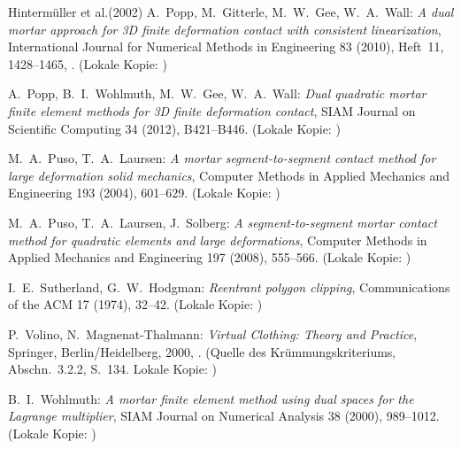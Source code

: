 \documentclass[a4paper,11pt]{article}
\begin{document}
\begin{thebibliography}{Hintermüller et al.(2002)}
 A.~Popp, M.~Gitterle, M.~W.~Gee, W.~A.~Wall: \emph{A dual mortar approach for 3D finite deformation contact with consistent linearization}, International Journal for Numerical Methods in Engineering 83 (2010), Heft~11, 1428--1465, . (Lokale Kopie: )

 A.~Popp, B.~I.~Wohlmuth, M.~W.~Gee, W.~A.~Wall: \emph{Dual quadratic mortar finite element methods for 3D finite deformation contact}, SIAM Journal on Scientific Computing 34 (2012), B421--B446. (Lokale Kopie: )

 M.~A.~Puso, T.~A.~Laursen: \emph{A mortar segment-to-segment contact method for large deformation solid mechanics}, Computer Methods in Applied Mechanics and Engineering 193 (2004), 601--629. (Lokale Kopie: )

 M.~A.~Puso, T.~A.~Laursen, J.~Solberg: \emph{A segment-to-segment mortar contact method for quadratic elements and large deformations}, Computer Methods in Applied Mechanics and Engineering 197 (2008), 555--566. (Lokale Kopie: )

 I.~E.~Sutherland, G.~W.~Hodgman: \emph{Reentrant polygon clipping}, Communications of the ACM 17 (1974), 32--42. (Lokale Kopie: )

 P.~Volino, N.~Magnenat-Thalmann: \emph{Virtual Clothing: Theory and Practice}, Springer, Berlin/Heidelberg, 2000, . (Quelle des Krümmungskriteriums, Abschn.~3.2.2, S.~134. Lokale Kopie: )

 B.~I.~Wohlmuth: \emph{A mortar finite element method using dual spaces for the Lagrange multiplier}, SIAM Journal on Numerical Analysis 38 (2000), 989--1012. (Lokale Kopie: )


\end{thebibliography}
\end{document}
